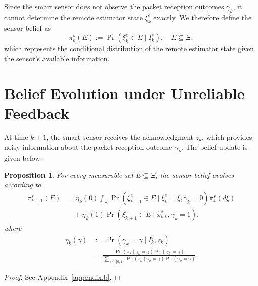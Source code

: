 \documentclass[letterpaper, 10 pt, conference]{ieeeconf}
\newtheorem{proposition}[theorem]{Proposition}
\begin{document}
Since the smart sensor does not observe the packet reception outcomes $\gamma_k$, it cannot determine the remote estimator state $\xi_k^e$ exactly. We therefore define the sensor belief as
\begin{equation}\label{belief.dfn}
    \pi_k^s(E) := \operatorname{Pr}(\xi_k^e \in E \mid I_k^s),\quad E\subseteq \Xi,
\end{equation}
which represents the conditional distribution of the remote estimator state given the sensor's available information.


\section{Belief Evolution under Unreliable Feedback}
\label{sec.belief.evolution}
At time $k+1$, the smart sensor receives the acknowledgment $z_k$, which provides noisy information about the packet reception outcome $\gamma_k$. The  belief update is given below.
\begin{proposition}\label{proposition.belief}
For every measurable set $E\subseteq \Xi$, the sensor belief evolves according to
\begin{align}\label{eq:belief_recursion}
    \pi_{k+1}^s(E) &= \eta_k(0)\int_{\Xi}\operatorname{Pr}(\xi^e_{k+1}\in E\mid \xi_k^e=\xi,\gamma_k=0)\pi_k^s(d\xi)\nonumber\\
    &\quad +\eta_k(1)\operatorname{Pr}(\xi^e_{k+1}\in E\mid \hat{x}^s_{k|k},\gamma_k=1),
\end{align}
where
\begin{align}\label{eta.eq}
    \eta_k(\gamma)&:=\operatorname{Pr}(\gamma_k=\gamma\mid I_k^s,z_k)\nonumber\\
    &=\frac{\operatorname{Pr}(z_k\mid \gamma_k=\gamma)\operatorname{Pr}(\gamma_k=\gamma)}{\sum_{\bar{\gamma}\in \{0,1\}}\operatorname{Pr}(z_k\mid \gamma_k=\bar{\gamma})\operatorname{Pr}(\gamma_k=\bar{\gamma})}.
\end{align}
\end{proposition}
\vspace{.2cm}
\begin{proof}
    See Appendix~\ref{appendix.b}.
\end{proof}
\end{document}
